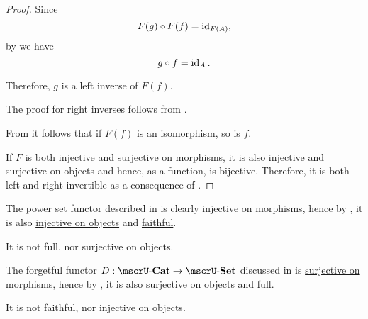 \begin{proof}
  Since
  \begin{equation*}
    F(g) \bincirc F(f) = \id_{F(A)},
  \end{equation*}
  by  we have
  \begin{equation*}
    g \bincirc f = \id_A.
  \end{equation*}

  Therefore, \( g \) is a left inverse of \( F(f) \).

  The proof for right inverses follows from .

  From  it follows that if \( F(f) \) is an isomorphism, so is \( f \).

   If \( F \) is both injective and surjective on morphisms, it is also injective and surjective on objects and hence, as a function, is bijective. Therefore, it is both left and right invertible as a consequence of .
\end{proof}

\begin{example}\label{ex:def:functor_invertibility}
  \hfill
  \begin{thmenum}
     The power set functor described in  is clearly \hyperref[def:functor_invertibility/injective_on_morphisms]{injective on morphisms}, hence by , it is also \hyperref[def:functor_invertibility/injective_on_objects]{injective on objects} and \hyperref[def:functor_invertibility/faithful]{faithful}.

    It is not full, nor surjective on objects.

     The forgetful functor \( D: \ucat{Cat} \to \ucat{Set} \) discussed in  is \hyperref[def:functor_invertibility/surjective_on_morphisms]{surjective on morphisms}, hence by , it is also \hyperref[def:functor_invertibility/surjective_on_objects]{surjective on objects} and \hyperref[def:functor_invertibility/full]{full}.

    It is not faithful, nor injective on objects.
  \end{thmenum}
\end{example}

